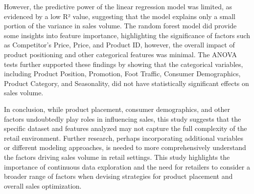 \documentclass[stu,12pt,floatsintext]{apa7}
\begin{document}
However, the predictive power of the linear regression model was limited, as evidenced by a low R² value, suggesting that the model explains only a small portion of the variance in sales volume. The random forest model did provide some insights into feature importance, highlighting the significance of factors such as Competitor’s Price, Price, and Product ID, however, the overall impact of product positioning and other categorical features was minimal. The ANOVA tests further supported these findings by showing that the categorical variables, including Product Position, Promotion, Foot Traffic, Consumer Demographics, Product Category, and Seasonality, did not have statistically significant effects on sales volume.

In conclusion, while product placement, consumer demographics, and other factors undoubtedly play roles in influencing sales, this study suggests that the specific dataset and features analyzed may not capture the full complexity of the retail environment. Further research, perhaps incorporating additional variables or different modeling approaches, is needed to more comprehensively understand the factors driving sales volume in retail settings. This study highlights the importance of continuous data exploration and the need for retailers to consider a broader range of factors when devising strategies for product placement and overall sales optimization.


\printbibliography
\end{document}
